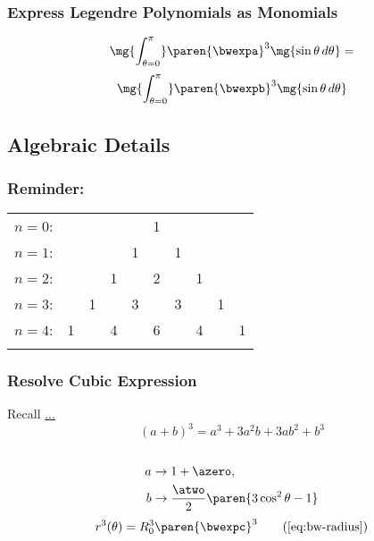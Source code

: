 \begin{frame}\frametitle{Express Legendre Polynomials as Monomials\jumpLittle}
$$\mg{\int_{\theta=0}^{\pi}} \paren{\bwexpa}^{3}  \mg{\sin{\theta} \, d\theta} = $$
$$\mg{\int_{\theta=0}^{\pi}}  \paren{\bwexpb}^{3}  \mg{\sin{\theta} \, d\theta} $$
\end{frame}


\subsection{Algebraic Details}

\begin{frame}\frametitle{Reminder: }
\center
\begin{tabular}{rccccccccc}
$n=0$:&    &    &    &    &  1\\\noalign{\smallskip\smallskip}
$n=1$:&    &    &    &  1 &    &  1\\\noalign{\smallskip\smallskip}
$n=2$:&    &    &  1 &    &  2 &    &  1\\\noalign{\smallskip\smallskip}
$n=3$:&    &  1 &    &  3 &    &  3 &    &  1\\\noalign{\smallskip\smallskip}
$n=4$:&  1 &    &  4 &    &  6 &    &  4 &    &  1\\\noalign{\smallskip\smallskip}
\end{tabular}
\end{frame}

\begin{frame}\frametitle{Resolve Cubic Expression}
Recall \href{https://mathworld.wolfram.com/PascalsTriangle.html}{...} \\
$$(a+b)^{3} = a^3+3 a^2 b+3 a b^2+b^3$$
%
\ \\
\pause
\begin{equation}
	\begin{split}
		a &\to 1 + \azero , \\
		b &\to \frac{\atwo}{2} \paren{3 \cos^{2} \theta - 1}
	\end{split}
\end{equation}
%
\begin{equation}
	r^{3}(\theta) = R_{0}^{3}\paren{\bwexpc}^{3}
\tag{\ref{eq:bw-radius}}
\end{equation}
\end{frame}


